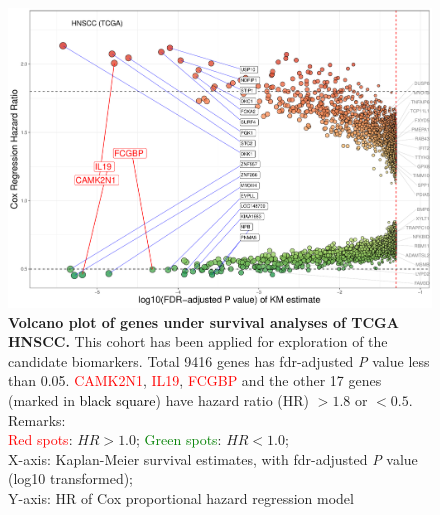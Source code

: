 \documentclass[jpm,article,submit,moreauthors,pdftex]{Definitions/mdpi}
\newcommand{\bcaption}[2]{\caption{\textbf{#1} #2}}
\begin{document}




\begin{figure}
    \centering
    \includegraphics[width=13cm]{Rplot_TCGA_HNSCC_CoxHR_CAMK2N1_top3FDRKM.pdf}
    \bcaption{Volcano plot of genes under survival analyses of TCGA HNSCC.}{
    This cohort has been applied for exploration of the candidate biomarkers.
    Total 9416 genes has \acrshort{fdr}-adjusted \textit{P} value less than 0.05.
    \textcolor{red}{CAMK2N1}, \textcolor{red}{IL19}, \textcolor{red}{FCGBP} and the other 17 genes (marked in \textcolor{black}{black square}) have hazard ratio (HR) $> 1.8$ or $< 0.5$.\\
    Remarks:\\
    \textcolor{red}{Red spots}: $HR > 1.0$;
    \textcolor{green}{Green spots}: $HR < 1.0$;\\
    X-axis: Kaplan-Meier survival estimates, with \acrshort{fdr}-adjusted \textit{P} value (log10 transformed);\\
    Y-axis: HR of Cox proportional hazard regression model\\
    }
\label{fig:hazards3} %
\end{figure}
\end{document}

